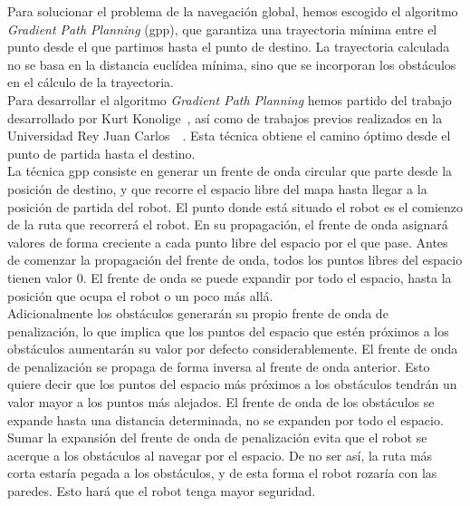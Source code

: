 Para solucionar el problema de la navegación global, hemos escogido el algoritmo \textit{Gradient Path Planning} (\acrshort{gpp}), que garantiza una trayectoria mínima entre el punto desde el que partimos hasta el punto de destino. La trayectoria calculada no se basa en la distancia euclídea mínima, sino que se incorporan los obstáculos en el cálculo de la trayectoria.\\

Para desarrollar el algoritmo \textit{Gradient Path Planning} hemos partido del trabajo desarrollado por Kurt Konolige~\cite{gradient}, así como de trabajos previos realizados en la Universidad Rey Juan Carlos~\cite{navegacion_autolocalizacion3}~\cite{navegacion_autolocalizacion4}. Esta técnica obtiene el camino óptimo desde el punto de partida hasta el destino.\\

La técnica \acrshort{gpp} consiste en generar un frente de onda circular que parte desde la posición de destino, y que recorre el espacio libre del mapa hasta llegar a la posición de partida del robot. El punto donde está situado el robot es el comienzo de la ruta que recorrerá el robot. En su propagación, el frente de onda asignará valores de forma creciente a cada punto libre del espacio por el que pase. Antes de comenzar la propagación del frente de onda, todos los puntos libres del espacio tienen valor 0. El frente de onda se puede expandir por todo el espacio, hasta la posición que ocupa el robot o un poco más allá.\\

Adicionalmente los obstáculos generarán su propio frente de onda de penalización, lo que implica que los puntos del espacio que estén próximos a los obstáculos aumentarán su valor por defecto considerablemente. El frente de onda de penalización se propaga de forma inversa al frente de onda anterior. Esto quiere decir que los puntos del espacio más próximos a los obstáculos tendrán un valor mayor a los puntos más alejados. El frente de onda de los obstáculos se expande hasta una distancia determinada, no se expanden por todo el espacio.\\

Sumar la expansión del frente de onda de penalización evita que el robot se acerque a los obstáculos al navegar por el espacio. De no ser así, la ruta más corta estaría pegada a los obstáculos, y de esta forma el robot rozaría con las paredes. Esto hará que el robot tenga mayor seguridad.\\

